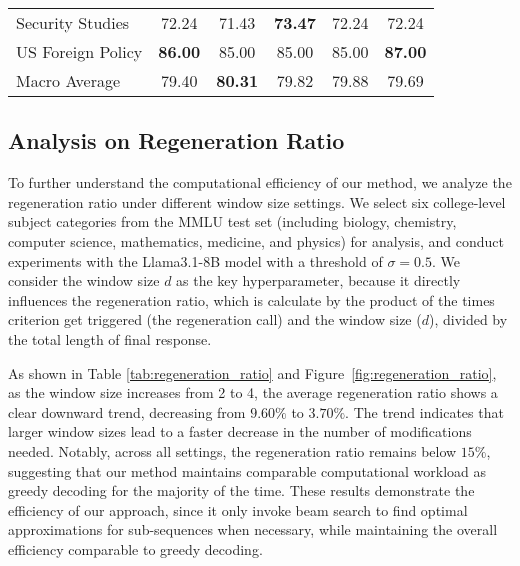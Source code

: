 \begin{table*}[h]
\begin{tabular}{lccccc}
        Security Studies                    & 72.24                 & 71.43                  & \textbf{73.47}        & 72.24                  & 72.24                 \\
        US Foreign Policy                   & \textbf{86.00}        & 85.00                  & 85.00                 & 85.00                  & \textbf{87.00}        \\
        \midrule
        Macro Average                       & 79.40                 & \textbf{80.31}         & 79.82                 & 79.88                  & 79.69                 \\
        \bottomrule
    \end{tabular}
\end{table*}

\subsection{Analysis on Regeneration Ratio}
To further understand the computational efficiency of our method, we analyze the regeneration ratio under different window size settings.
We select six college-level subject categories from the MMLU test set (including biology, chemistry, computer science, mathematics, medicine, and physics) for analysis, and conduct experiments with the Llama3.1-8B model with a threshold of $\sigma=0.5$.
We consider the window size $d$ as the key hyperparameter, because it directly influences the regeneration ratio, which is calculate by the product of the times criterion get triggered (the regeneration call) and the window size ($d$), divided by the total length of final response.

As shown in Table \ref{tab:regeneration_ratio} and Figure~\ref{fig:regeneration_ratio}, as the window size increases from 2 to 4, the average regeneration ratio shows a clear downward trend, decreasing from $9.60\%$ to $3.70\%$.
The trend indicates that larger window sizes lead to a faster decrease in the number of modifications needed.
Notably, across all settings, the regeneration ratio remains below $15\%$, suggesting that our method maintains comparable computational workload as greedy decoding for the majority of the time.
These results demonstrate the efficiency of our approach, since it only invoke beam search to find optimal approximations for sub-sequences when necessary, while maintaining the overall efficiency comparable to greedy decoding.

